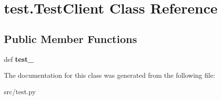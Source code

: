 \hypertarget{classtest_1_1_test_client}{\section{test.\-Test\-Client \-Class \-Reference}
\label{classtest_1_1_test_client}
}
\subsection*{\-Public \-Member \-Functions}
\begin{DoxyCompactItemize}
\item 
\hypertarget{classtest_1_1_test_client_ac755b41364bcbd58ef8539796cfacbeb}{def {\bfseries test\-\_\-}}\label{classtest_1_1_test_client_ac755b41364bcbd58ef8539796cfacbeb}

\end{DoxyCompactItemize}


\-The documentation for this class was generated from the following file\-:\begin{DoxyCompactItemize}
\item 
src/test.\-py\end{DoxyCompactItemize}
